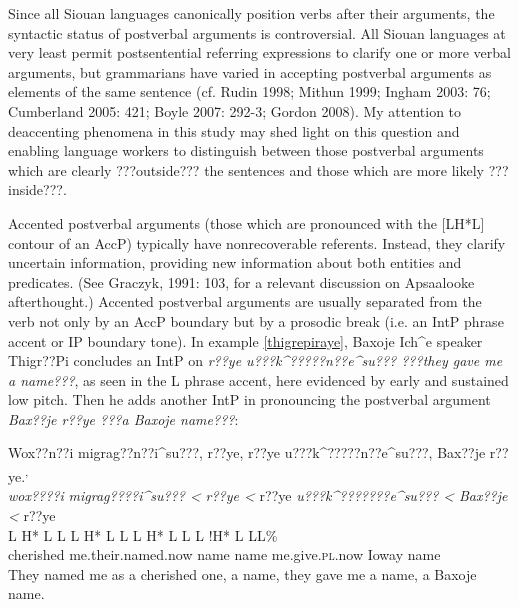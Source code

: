\documentclass[output=paper]{LSP/langsci}
\begin{document}
Since all Siouan languages canonically position verbs after their arguments, the syntactic status of postverbal arguments is controversial. All Siouan languages at very least permit postsentential referring expressions to clarify one or more verbal arguments, but grammarians have varied in accepting postverbal arguments as elements of the same sentence (cf. Rudin 1998; Mithun 1999; Ingham 2003: 76; Cumberland 2005: 421; Boyle 2007: 292-3; Gordon 2008). My attention to deaccenting phenomena in this study may shed light on this question and enabling language workers to distinguish between those postverbal arguments which are clearly ???outside??? the sentences and those which are more likely ???inside???.

Accented postverbal arguments (those which are pronounced with the [LH*L] contour of an AccP) typically have nonrecoverable referents. Instead, they clarify uncertain information, providing new information about both entities and predicates. (See Graczyk, 1991: 103, for a relevant discussion on Apsaalooke afterthought.) Accented postverbal arguments are usually separated from the verb not only by an AccP boundary but by a prosodic break (i.e. an IntP phrase accent or IP boundary tone). In example \ref{thigrepiraye}, Baxoje Ich\^{}e speaker Thigr??Pi concludes an IntP on \emph{r??ye u???k\^{}?????n??e\^{}su??? ???they gave me a name???}, as seen in the L phrase accent, here evidenced by early and sustained low pitch. Then he adds another IntP in pronouncing the postverbal argument \emph{Bax??je r??ye ???a Baxoje name???}:

\ea\label{thigrepiraye}
Wox??n??i migrag??n??i\^{}su???, r??ye, r??ye u???k\^{}?????n??e\^{}su???, Bax??je r??ye.\footnotemark\textsuperscript{,} \footnotemark\\
\glll	\emph{wox????i} 	\emph{migrag????i\^{}su??? <}		\emph{r??ye <}	r??ye		\emph{u???k\^{}???????e\^{}su??? <}	\emph{Bax??je <}		r??ye\\
	{\ob L H* L}		{L\cb}	{\ob L H* L L\cb}	{\ob L H* L}	{L\cb}	{\ob L !H* L} 		{L\cb{}L\%}\\
	cherished	me.their.named.now	name		name	me.give.\textsc{pl}.now	Ioway			name\\
\glt	They named me as a cherished one, a name, they gave me a name, a Baxoje name.
\z
\end{document}
